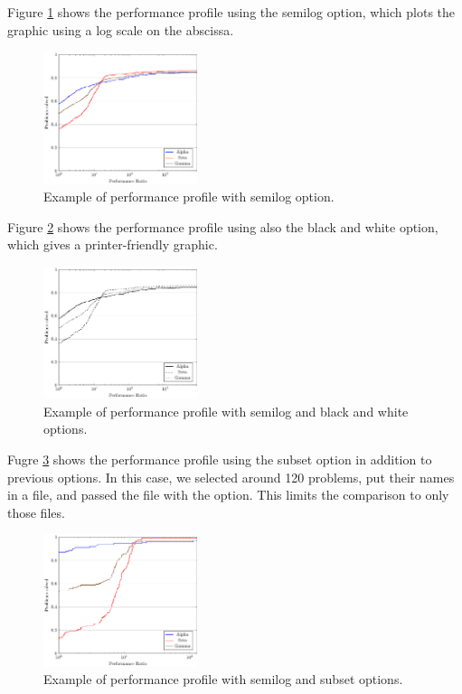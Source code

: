     Figure \ref{fig:example2} shows the performance profile using the semilog
    option, which plots the graphic using a log scale on the abscissa.
    \begin{figure}[!ht]
      \centering
      \includegraphics[width=0.4\textwidth]{plots/abc-semilog.pdf}
      \caption{Example of performance profile with semilog option.}
      \label{fig:example2}
    \end{figure}
    Figure \ref{fig:example3} shows the performance profile using also the black
    and white option, which gives a printer-friendly graphic.
    \begin{figure}[!ht]
      \centering
      \includegraphics[width=0.4\textwidth]{plots/abc-semilog-bw.pdf}
      \caption{Example of performance profile with semilog and black and white
        options.}
      \label{fig:example3}
    \end{figure}
    Fugre \ref{fig:example4} shows the performance profile using the subset
    option in addition to previous options. In this case, we selected around 120
    problems, put their names in a file, and passed the file with the option.
    This limits the comparison to only those files.
    \begin{figure}[!ht]
      \centering
      \includegraphics[width=0.4\textwidth]{plots/abc-semilog-hs.pdf}
      \caption{Example of performance profile with semilog and subset options.}
      \label{fig:example4}
    \end{figure}

